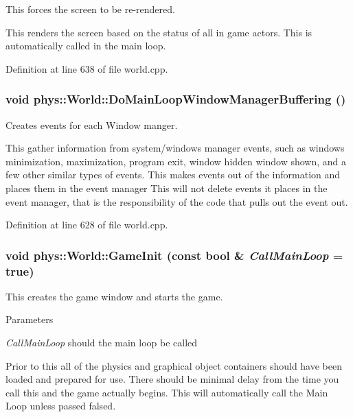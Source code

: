 This forces the screen to be re-\/rendered. 

This renders the screen based on the status of all in game actors. This is automatically called in the main loop. 

Definition at line 638 of file world.cpp.

\hypertarget{classphys_1_1World_af7bc68e5a19fd4c9c8cc2437485096e1}{
\subsubsection[{DoMainLoopWindowManagerBuffering}]{\setlength{\rightskip}{0pt plus 5cm}void phys::World::DoMainLoopWindowManagerBuffering ()}}
\label{da/ddf/classphys_1_1World_af7bc68e5a19fd4c9c8cc2437485096e1}


Creates events for each Window manger. 

This gather information from system/windows manager events, such as windows minimization, maximization, program exit, window hidden window shown, and a few other similar types of events. This makes events out of the information and places them in the event manager This will not delete events it places in the event manager, that is the responsibility of the code that pulls out the event out. 

Definition at line 628 of file world.cpp.

\hypertarget{classphys_1_1World_a21cc36be08a61f40619584d4c438936b}{
\subsubsection[{GameInit}]{\setlength{\rightskip}{0pt plus 5cm}void phys::World::GameInit (const bool \& {\em CallMainLoop} = {\ttfamily true})}}
\label{da/ddf/classphys_1_1World_a21cc36be08a61f40619584d4c438936b}


This creates the game window and starts the game. 


\begin{DoxyParams}{Parameters}
\item[{\em CallMainLoop}]should the main loop be called\end{DoxyParams}
Prior to this all of the physics and graphical object containers should have been loaded and prepared for use. There should be minimal delay from the time you call this and the game actually begins. This will automatically call the Main Loop unless passed falsed. 

